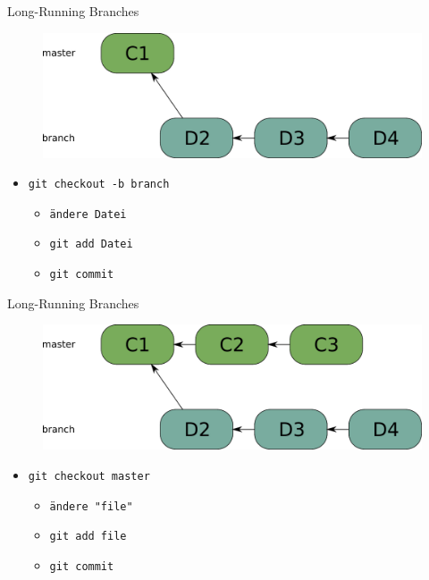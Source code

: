 \begin{frame}{Long-Running Branches}
  \begin{figure}
  \centering
    \includegraphics[scale=0.5]{images/long-running-branch.pdf}
  \end{figure}
  \tiny
  \begin{itemize}
  \pause \item \texttt{git checkout -b branch}
    \begin{itemize}
	  \pause \item \tiny \texttt{ändere Datei}
	  \pause \item \texttt{git add Datei}
	  \pause \item \texttt{git commit}
    \end{itemize}
  \end{itemize}
\end{frame}


\begin{frame}{Long-Running Branches}
  \begin{figure} 
  \centering
    \includegraphics[scale=0.5]{images/long-running-branch2.pdf}
  \end{figure}
  \tiny
  \begin{itemize}
    \pause \item \texttt{git checkout master}
    \begin{itemize}
      \pause \item \tiny \texttt{ändere "file"}
      \pause \item \texttt{git add file} 
      \pause \item \texttt{git commit}
    \end{itemize}
  \end{itemize}
\end{frame}

